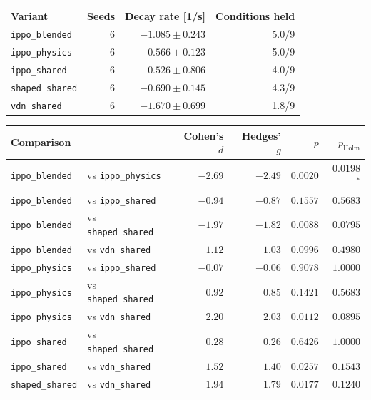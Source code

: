 \begin{tabular}{lrrr}
\toprule
Variant & Seeds & Decay rate [1/s] & Conditions held \\
\midrule
\texttt{ippo\_blended} & 6 & $-1.085 \pm 0.243$ & 5.0/9 \\
\texttt{ippo\_physics} & 6 & $-0.566 \pm 0.123$ & 5.0/9 \\
\texttt{ippo\_shared} & 6 & $-0.526 \pm 0.806$ & 4.0/9 \\
\texttt{shaped\_shared} & 6 & $-0.690 \pm 0.145$ & 4.3/9 \\
\texttt{vdn\_shared} & 6 & $-1.670 \pm 0.699$ & 1.8/9 \\
\bottomrule
\end{tabular}

\vspace{0.5em}

\begin{tabular}{llrrrr}
\toprule
Comparison & & Cohen's $d$ & Hedges' $g$ & $p$ & $p_{\mathrm{Holm}}$ \\
\midrule
\texttt{ippo\_blended} & vs \texttt{ippo\_physics} & $-2.69$ & $-2.49$ & $0.0020$ & $0.0198$$^{*}$ \\
\texttt{ippo\_blended} & vs \texttt{ippo\_shared} & $-0.94$ & $-0.87$ & $0.1557$ & $0.5683$ \\
\texttt{ippo\_blended} & vs \texttt{shaped\_shared} & $-1.97$ & $-1.82$ & $0.0088$ & $0.0795$ \\
\texttt{ippo\_blended} & vs \texttt{vdn\_shared} & $1.12$ & $1.03$ & $0.0996$ & $0.4980$ \\
\texttt{ippo\_physics} & vs \texttt{ippo\_shared} & $-0.07$ & $-0.06$ & $0.9078$ & $1.0000$ \\
\texttt{ippo\_physics} & vs \texttt{shaped\_shared} & $0.92$ & $0.85$ & $0.1421$ & $0.5683$ \\
\texttt{ippo\_physics} & vs \texttt{vdn\_shared} & $2.20$ & $2.03$ & $0.0112$ & $0.0895$ \\
\texttt{ippo\_shared} & vs \texttt{shaped\_shared} & $0.28$ & $0.26$ & $0.6426$ & $1.0000$ \\
\texttt{ippo\_shared} & vs \texttt{vdn\_shared} & $1.52$ & $1.40$ & $0.0257$ & $0.1543$ \\
\texttt{shaped\_shared} & vs \texttt{vdn\_shared} & $1.94$ & $1.79$ & $0.0177$ & $0.1240$ \\
\bottomrule
\end{tabular}
